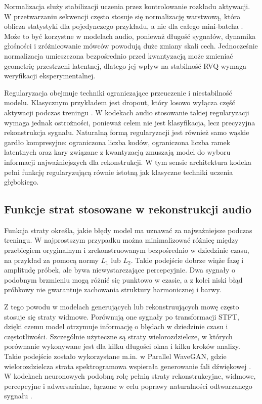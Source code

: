 Normalizacja służy stabilizacji uczenia przez kontrolowanie rozkładu aktywacji. W przetwarzaniu sekwencji często stosuje się normalizację warstwową, która oblicza statystyki dla pojedynczego przykładu, a nie dla całego mini-batcha \cite{Ba2016LayerNormalization}. Może to być korzystne w modelach audio, ponieważ długość sygnałów, dynamika głośności i zróżnicowanie mówców powodują duże zmiany skali cech. Jednocześnie normalizacja umieszczona bezpośrednio przed kwantyzacją może zmieniać geometrię przestrzeni latentnej, dlatego jej wpływ na stabilność RVQ wymaga weryfikacji eksperymentalnej.

Regularyzacja obejmuje techniki ograniczające przeuczenie i niestabilność modelu. Klasycznym przykładem jest dropout, który losowo wyłącza część aktywacji podczas treningu \cite{Srivastava2014Dropout}. W kodekach audio stosowanie takiej regularyzacji wymaga jednak ostrożności, ponieważ celem nie jest klasyfikacja, lecz precyzyjna rekonstrukcja sygnału. Naturalną formą regularyzacji jest również samo wąskie gardło kompresyjne: ograniczona liczba kodów, ograniczona liczba ramek latentnych oraz kary związane z kwantyzacją zmuszają model do wyboru informacji najważniejszych dla rekonstrukcji. W tym sensie architektura kodeka pełni funkcję regularyzującą równie istotną jak klasyczne techniki uczenia głębokiego.

\subsection{Funkcje strat stosowane w rekonstrukcji audio}
\label{subsec:funkcje-strat-rekonstrukcja-audio}

Funkcja straty określa, jakie błędy model ma uznawać za najważniejsze podczas treningu. W najprostszym przypadku można minimalizować różnicę między przebiegiem oryginalnym i zrekonstruowanym bezpośrednio w dziedzinie czasu, na przykład za pomocą normy \(L_1\) lub \(L_2\). Takie podejście dobrze wiąże fazę i amplitudę próbek, ale bywa niewystarczające percepcyjnie. Dwa sygnały o podobnym brzmieniu mogą różnić się punktowo w czasie, a z kolei niski błąd próbkowy nie gwarantuje zachowania struktury harmonicznej i barwy.

Z tego powodu w modelach generujących lub rekonstruujących mowę często stosuje się straty widmowe. Porównują one sygnały po transformacji STFT, dzięki czemu model otrzymuje informację o błędach w dziedzinie czasu i częstotliwości. Szczególnie użyteczne są straty wielorozdzielcze, w których porównanie wykonywane jest dla kilku długości okna i kilku kroków analizy. Takie podejście zostało wykorzystane m.in. w Parallel WaveGAN, gdzie wielorozdzielcza strata spektrogramowa wspierała generowanie fali dźwiękowej \cite{Yamamoto2020ParallelWaveGAN}. W kodekach neuronowych podobną rolę pełnią straty rekonstrukcyjne, widmowe, percepcyjne i adwersarialne, łączone w celu poprawy naturalności odtwarzanego sygnału \cite{Zeghidour2021SoundStream,Defossez2022Encodec}.

